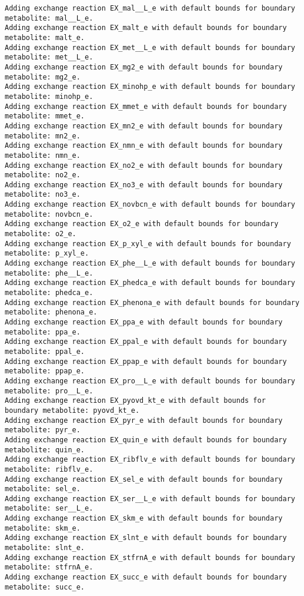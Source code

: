 \documentclass[
  letterpaper,
  DIV=11,
  numbers=noendperiod]{scrartcl}
\begin{document}
\begin{verbatim}
Adding exchange reaction EX_mal__L_e with default bounds for boundary metabolite: mal__L_e.
Adding exchange reaction EX_malt_e with default bounds for boundary metabolite: malt_e.
Adding exchange reaction EX_met__L_e with default bounds for boundary metabolite: met__L_e.
Adding exchange reaction EX_mg2_e with default bounds for boundary metabolite: mg2_e.
Adding exchange reaction EX_minohp_e with default bounds for boundary metabolite: minohp_e.
Adding exchange reaction EX_mmet_e with default bounds for boundary metabolite: mmet_e.
Adding exchange reaction EX_mn2_e with default bounds for boundary metabolite: mn2_e.
Adding exchange reaction EX_nmn_e with default bounds for boundary metabolite: nmn_e.
Adding exchange reaction EX_no2_e with default bounds for boundary metabolite: no2_e.
Adding exchange reaction EX_no3_e with default bounds for boundary metabolite: no3_e.
Adding exchange reaction EX_novbcn_e with default bounds for boundary metabolite: novbcn_e.
Adding exchange reaction EX_o2_e with default bounds for boundary metabolite: o2_e.
Adding exchange reaction EX_p_xyl_e with default bounds for boundary metabolite: p_xyl_e.
Adding exchange reaction EX_phe__L_e with default bounds for boundary metabolite: phe__L_e.
Adding exchange reaction EX_phedca_e with default bounds for boundary metabolite: phedca_e.
Adding exchange reaction EX_phenona_e with default bounds for boundary metabolite: phenona_e.
Adding exchange reaction EX_ppa_e with default bounds for boundary metabolite: ppa_e.
Adding exchange reaction EX_ppal_e with default bounds for boundary metabolite: ppal_e.
Adding exchange reaction EX_ppap_e with default bounds for boundary metabolite: ppap_e.
Adding exchange reaction EX_pro__L_e with default bounds for boundary metabolite: pro__L_e.
Adding exchange reaction EX_pyovd_kt_e with default bounds for boundary metabolite: pyovd_kt_e.
Adding exchange reaction EX_pyr_e with default bounds for boundary metabolite: pyr_e.
Adding exchange reaction EX_quin_e with default bounds for boundary metabolite: quin_e.
Adding exchange reaction EX_ribflv_e with default bounds for boundary metabolite: ribflv_e.
Adding exchange reaction EX_sel_e with default bounds for boundary metabolite: sel_e.
Adding exchange reaction EX_ser__L_e with default bounds for boundary metabolite: ser__L_e.
Adding exchange reaction EX_skm_e with default bounds for boundary metabolite: skm_e.
Adding exchange reaction EX_slnt_e with default bounds for boundary metabolite: slnt_e.
Adding exchange reaction EX_stfrnA_e with default bounds for boundary metabolite: stfrnA_e.
Adding exchange reaction EX_succ_e with default bounds for boundary metabolite: succ_e.

\end{verbatim}
\end{document}
